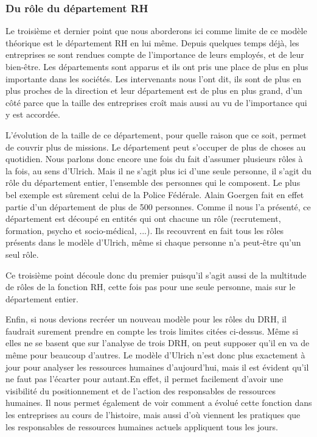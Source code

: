 \subsubsection*{Du rôle du département RH}

Le troisième et dernier point que nous aborderons ici comme limite de ce modèle théorique est le département RH en lui même. Depuis quelques temps déjà, les entreprises se sont rendues compte de l'importance de leurs employés, et de leur bien-être. Les départements sont apparus et ils ont pris une place de plus en plus importante dans les sociétés. Les intervenants nous l'ont dit, ils sont de plus en plus proches de la direction et leur département est de plus en plus grand, d'un côté parce que la taille des entreprises croît mais aussi au vu de l'importance qui y est accordée. \newline
{}

L'évolution de la taille de ce département, pour quelle raison que ce soit, permet de couvrir plus de missions. Le département peut s'occuper de plus de choses au quotidien. Nous parlons donc encore une fois du fait d'assumer plusieurs rôles à la fois, au sens d'Ulrich. Mais il ne s'agit plus ici d'une seule personne, il s'agit du rôle du département entier, l'ensemble des personnes qui le composent. Le plus bel exemple est sûrement celui de la Police Fédérale. Alain Goergen fait en effet partie d'un département de plus de 500 personnes. Comme il nous l'a présenté, ce département est découpé en entités qui ont chacune un rôle (recrutement, formation, psycho et socio-médical, ...). Ils recouvrent en fait tous les rôles présents dans le modèle d'Ulrich, même si chaque personne n'a peut-être qu'un seul rôle. \newline

Ce troisième point découle donc du premier puisqu'il s'agit aussi de la multitude de rôles de la fonction RH, cette fois pas pour une seule personne, mais sur le département entier. \newline

Enfin, si nous devions recréer un nouveau modèle pour les rôles du DRH, il faudrait surement prendre en compte les trois limites citées ci-dessus. Même si elles ne se basent que sur l'analyse de trois DRH, on peut supposer qu'il en va de même pour beaucoup d'autres. Le modèle d'Ulrich n'est donc plus exactement à jour pour analyser les ressources humaines d'aujourd'hui, mais il est évident qu'il ne faut pas l'écarter pour autant.En effet, il permet facilement d'avoir une visibilité du positionnement et de l'action des responsables de ressources humaines. Il nous permet également de voir comment a évolué cette fonction dans les entreprises au cours de l'histoire, mais aussi d'où viennent les pratiques que les responsables de ressources humaines actuels appliquent tous les jours. \newline
